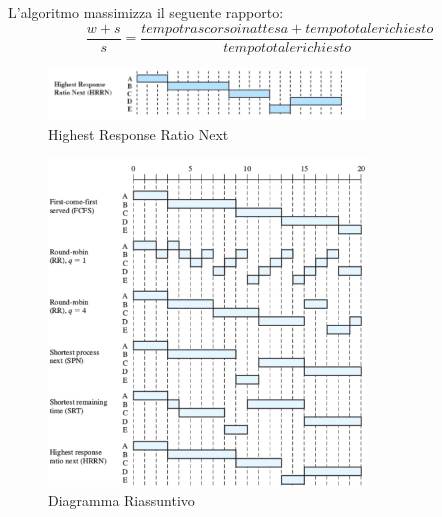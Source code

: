     L'algoritmo massimizza il seguente rapporto:
    \begin{equation}
        \frac{w+s}{s} = \frac{tempo trascorso in attesa + tempo totale richiesto}{tempo totale richiesto}
    \end{equation}
    \begin{figure}[H]
        \centering
        \includegraphics[width=0.75\textwidth]{immagini/HRRN}
        \caption{Highest Response Ratio Next}
    \end{figure}
    \begin{figure}[H]
        \centering
        \includegraphics[width=0.75\textwidth]{immagini/RiassuntoScheduling}
        \caption{Diagramma Riassuntivo}
    \end{figure}
